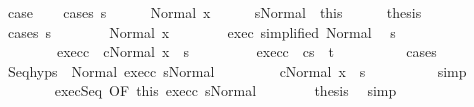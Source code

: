 \begin{isabellebody}
\ {\isacharquery}case\isanewline
\ \ \isamarkupfalse%
\ {\isacharparenleft}cases\ s{\isacharparenright}\isanewline
\ \ \ \ \isamarkupfalse%
\ {\isacharparenleft}Normal\ x{\isacharparenright}\isanewline
\ \ \ \ \isamarkupfalse%
\ s{\isacharunderscore}Normal\ {\isacharequal}\ this\isanewline
\ \ \ \ \isamarkupfalse%
\ {\isacharquery}thesis\isanewline
\ \ \ \ \isamarkupfalse%
\ {\isacharparenleft}cases\ s{\isacharprime}{\isacharparenright}\isanewline
\ \ \ \ \ \ \isamarkupfalse%
\ {\isacharparenleft}Normal\ x{\isacharprime}{\isacharparenright}\isanewline
\ \ \ \ \ \ \isamarkupfalse%
\ exec{\isacharprime}\ {\isacharbrackleft}simplified\ Normal{\isacharbrackright}\ \isamarkupfalse%
\ s{\isacharprime}{\isacharprime}\ \isanewline
\ \ \ \ \ \ \ \ exec{\isacharunderscore}c\ {\isachardoublequoteopen}{\isasymGamma}{\isasymturnstile}\ {\isasymlangle}cNormal\ x{\isacharprime}{\isasymrangle}\ {\isasymRightarrow}\ s{\isacharprime}{\isacharprime}{\isachardoublequoteclose}\ \isanewline
\ \ \ \ \ \ \ \ exec{\isacharunderscore}c\ {\isachardoublequoteopen}{\isasymGamma}{\isasymturnstile}\ {\isasymlangle}cs{\isacharprime}{\isacharprime}{\isasymrangle}\ {\isasymRightarrow}\ t{\isachardoublequoteclose}\isanewline
\ \ \ \ \ \ \ \ \isamarkupfalse%
\ cases\isanewline
\ \ \ \ \ \ \isamarkupfalse%
\ Seq{\isachardot}hyps\ {\isacharparenleft}{}{\isacharparenright}\ Normal\ exec{\isacharunderscore}c\ s{\isacharunderscore}Normal\isanewline
\ \ \ \ \ \ \isamarkupfalse%
\ {\isachardoublequoteopen}{\isasymGamma}{\isasymturnstile}\ {\isasymlangle}cNormal\ x{\isasymrangle}\ {\isasymRightarrow}\ s{\isacharprime}{\isacharprime}{\isachardoublequoteclose}\isanewline
\ \ \ \ \ \ \ \ \isamarkupfalse%
\ simp\isanewline
\ \ \ \ \ \ \isamarkupfalse%
\ exec{\isachardot}Seq\ {\isacharbrackleft}OF\ this\ exec{\isacharunderscore}c\ s{\isacharunderscore}Normal\isanewline
\ \ \ \ \ \ \isamarkupfalse%
\ {\isacharquery}thesis\ \isamarkupfalse%
\ simp\isanewline
\ \ \ \ \isamarkupfalse%

\end{isabellebody}
